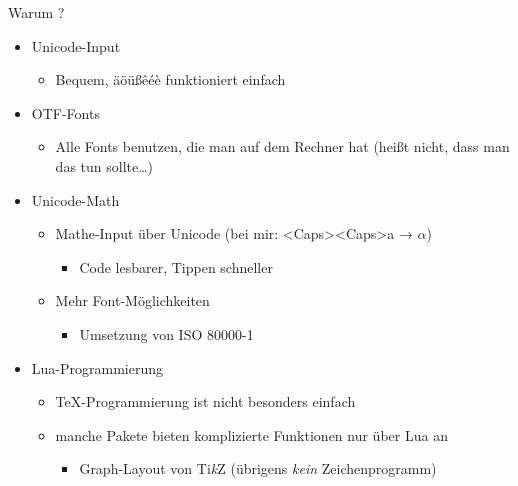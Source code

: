 \begin{frame}[fragile]{Warum \LuaTeX?}
  \begin{itemize}
    \item Unicode-Input
      \begin{itemize}
        \item Bequem, äöüßêéè funktioniert einfach
      \end{itemize}
    \item OTF-Fonts
      \begin{itemize}
        \item Alle Fonts benutzen, die man auf dem Rechner hat (heißt nicht, dass man das tun sollte…)
      \end{itemize}
    \item Unicode-Math
      \begin{itemize}
        \item Mathe-Input über Unicode (bei mir: <Caps><Caps>a → $α$)
          \begin{itemize}
            \item Code lesbarer, Tippen schneller
            \end{itemize}
        \item Mehr Font-Möglichkeiten
          \begin{itemize}
            \item Umsetzung von ISO 80000-1
          \end{itemize}
      \end{itemize}
    \item Lua-Programmierung
      \begin{itemize}
        \item \TeX-Programmierung ist nicht besonders einfach
        \item manche Pakete bieten komplizierte Funktionen nur über Lua an
          \begin{itemize}
            \item Graph-Layout von Ti\emph{k}Z (übrigens \emph{kein} Zeichenprogramm)
          \end{itemize}
      \end{itemize}
  \end{itemize}
\end{frame}

\begin{frame}[t]
  \centering
\end{frame}

